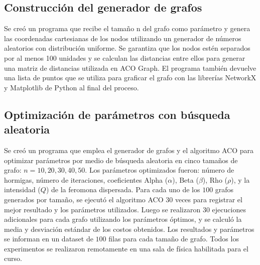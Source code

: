 \documentclass[conference]{IEEEtran}
\begin{document}
\subsection{Construcción del generador de grafos}
Se creó un programa que recibe el tamaño n del grafo como parámetro y genera las coordenadas cartesianas de los nodos utilizando un generador de números aleatorios con distribución uniforme. Se garantiza que los nodos estén separados por al menos 100 unidades y se calculan las distancias entre ellos para generar una matriz de distancias utilizada en ACO Graph. El programa también devuelve una lista de puntos que se utiliza para graficar el grafo con las librerías NetworkX y Matplotlib de Python al final del proceso.
\subsection{Optimización de parámetros con búsqueda aleatoria}
Se creó un programa que emplea el generador de grafos y el algoritmo ACO para optimizar parámetros por medio de búsqueda aleatoria en cinco tamaños de grafo: $n=10,20,30,40,50$. Los parámetros optimizados fueron: número de hormigas, número de iteraciones, coeficientes Alpha ($\alpha$), Beta ($\beta$), Rho ($\rho$), y la intensidad ($Q$) de la feromona dispersada. Para cada uno de los $100$ grafos generados por tamaño, se ejecutó el algoritmo ACO $30$ veces para registrar el mejor resultado y los parámetros utilizados. Luego se realizaron $30$ ejecuciones adicionales para cada grafo utilizando los parámetros óptimos, y se calculó la media y desviación estándar de los costos obtenidos. Los resultados y parámetros se informan en un dataset de $100$ filas para cada tamaño de grafo. Todos los experimentos se realizaron remotamente en una sala de física habilitada para el curso.
\end{document}

